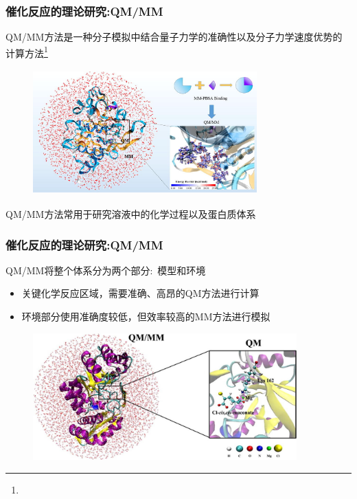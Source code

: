 \frame
{
	\frametitle{催化反应的理论研究:\textrm{QM/MM}}
\textrm{QM/MM}方法是一种分子模拟中结合量子力学的准确性以及分子力学速度优势的计算方法\footnote{\fontsize{6.0pt}{4.2pt}}
\begin{figure}[h!]
\centering
\vspace{-10.5pt}
\includegraphics[height=1.90in,width=3.40in,viewport=0 0 240 140,clip]{Figures/QM-MM_part.jpg}
\label{QM-MM_depart}
\end{figure}
\textrm{QM/MM}方法常用于研究溶液中的化学过程以及蛋白质体系
}

\frame
{
	\frametitle{催化反应的理论研究:\textrm{QM/MM}}
	\textrm{QM/MM}将整个体系分为两个部分:~模型和环境
	\begin{itemize}
		\item 关键化学反应区域，需要准确、高昂的\textrm{QM}方法进行计算
		\item 环境部分使用准确度较低，但效率较高的\textrm{MM}方法进行模拟
	\end{itemize}
\begin{figure}[h!]
\centering
\vspace{-10.5pt}
\includegraphics[height=1.92in,width=4.0in,viewport=0 0 280 130,clip]{Figures/QM_MM-2.jpg}
\label{QM-MM-surface}
\end{figure}
}

